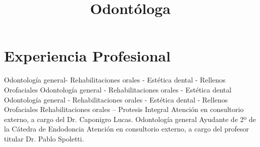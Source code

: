 \documentclass[11pt,a4paper,sans]{moderncv}        %
\title{Odont\'ologa}                               %
\begin{document}
\makecvtitle

\section{Experiencia Profesional}
  {
        Odontolog\'ia general- Rehabilitaciones orales - Est\'etica dental - Rellenos Orofaciales
  }
\vspace*{2mm} 
  {
    Odontolog\'ia general - Rehabilitaciones orales - Est\'etica dental 
  }
\vspace*{2mm}
  {
    Odontolog\'ia general - Rehabilitaciones orales - Est\'etica dental - Rellenos Orofaciales  
  }
\vspace*{2mm} 
  {
    Rehabilitaciones orales – Protesis Integral
    Atenci\'on en consultorio externo, a cargo del Dr. Caponigro Lucas.
  }
\vspace*{2mm} 
  {
    Odontolog\'ia general
  }
\vspace*{2mm}
  {
    Ayudante de 2º de la C\'atedra de Endodoncia
    Atenci\'on en consultorio externo, a cargo del profesor titular Dr. Pablo Spoletti.
  }
\end{document}
